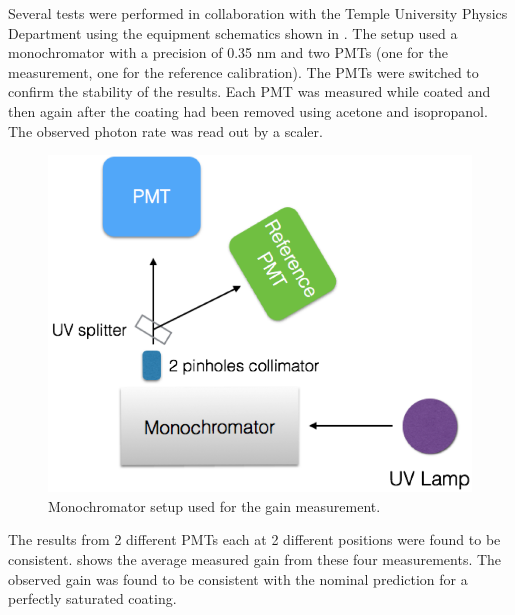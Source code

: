 Several tests were performed in collaboration with the Temple University Physics Department using the equipment schematics
shown in . The setup used a monochromator with a precision of 0.35 nm and two PMTs (one for the measurement,
one for the   reference calibration). The PMTs were switched to confirm the stability of the results. Each PMT was measured
while coated and then again after the coating had been removed using acetone and isopropanol.
The observed photon rate was read out by a scaler.

\begin{figure}
	\centering
	\includegraphics[width=0.95\columnwidth,keepaspectratio]{img/pmtTestingSetup.png}
	\caption{Monochromator setup used for the gain measurement.}
	\label{fig:pmtTestingSetup}
\end{figure}

The results from 2 different PMTs each at 2 different positions were found to be
consistent.  shows the average measured gain from these four
measurements. The observed gain was found to be consistent with the nominal
prediction for a perfectly saturated coating.

